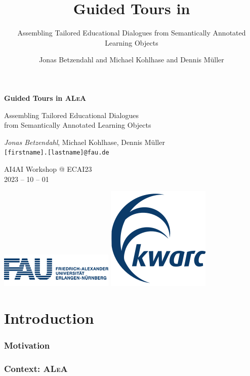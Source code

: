 \documentclass[aspectratio=169, usenames, dvipsnames]{beamer}
\author{Jonas Betzendahl and Michael Kohlhase and Dennis Müller}
\title{Guided Tours in \ALeA}
\subtitle{Assembling Tailored Educational Dialogues from Semantically Annotated Learning Objects}
\def\ALeA{\textsc{ALeA}\xspace}
\begin{document}
\begin{frame}
\begin{center}
\huge \textbf{Guided Tours in \ALeA}\medskip

\large Assembling Tailored Educational Dialogues\\ from Semantically Annotated Learning Objects

\normalsize 
\bigskip\bigskip

\large \emph{Jonas Betzendahl}, Michael Kohlhase, Dennis Müller\\
\texttt{[firstname].[lastname]@fau.de}\bigskip

\small
AI4AI Workshop @ ECAI23\\
2023 -- 10 -- 01
\medskip

\includegraphics[scale=0.5]{images/fau_logo.png}
\qquad
\includegraphics[scale=0.25]{images/kwarclogo_faublau.png} 
\end{center}
\end{frame}

\section{Introduction}

\begin{frame}
\frametitle{Motivation}
\end{frame}

\begin{frame}[fragile]
\frametitle{Context: \ALeA}

\end{frame}
\end{document}
